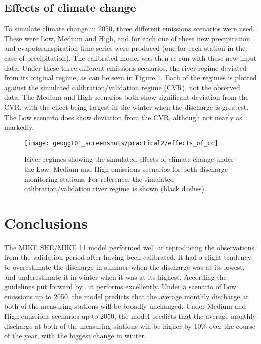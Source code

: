 \documentclass{article}
\begin{document}
\newpage

\subsection{Effects of climate change}

To simulate climate change in 2050, three different emissions scenarios were used. These were Low, Medium and High, and for each one of these new precipitation and evapotsranspiration time series were produced (one for each station in the case of precipitation). The calibrated model was then re-run with these new input data. Under these three different emissions scenarios, the river regime deviated from its original regime, as can be seen in Figure \ref{fig:effects_of_cc}. Each of the regimes is plotted against the simulated calibration/validation regime (CVR), not the observed data. The Medium and High scenarios both show significant deviation from the CVR, with the effect being largest in the winter when the discharge is greatest. The Low scenario does show deviation from the CVR, although not nearly as markedly.

\begin{figure}[!h]
    \centering
    \texttt{[image: geogg101\_screenshots/practical2/effects\_of\_cc]}
    \caption{River regimes showing the simulated effects of climate change under the Low, Medium and High emissions scenarios for both discharge monitoring stations. For reference, the simulated calibration/validation river regime is shown (black dashes). }
    \label{fig:effects_of_cc}
\end{figure}

\section{Conclusions}

The MIKE SHE/MIKE 11 model performed well at reproducing the observations from the validation period after having been calibrated.
It had a slight tendency to overestimate the discharge in summer when the discharge was at its lowest, and underestimate it in winter when it was at its highest.
According the guidelines put forward by \textcite{henriksen2008assessment}, it performs excellently.
Under a scenario of Low emissions up to 2050, the model predicts that the average monthly discharge at both of the measuring stations will be broadly unchanged.
Under Medium and High emissions scenarios up to 2050, the model predicts that the average monthly discharge at both of the measuring stations will be higher by 10\% over the course of the year, with the biggest change in winter.


\printbibliography[filter=practical2]
\end{document}
